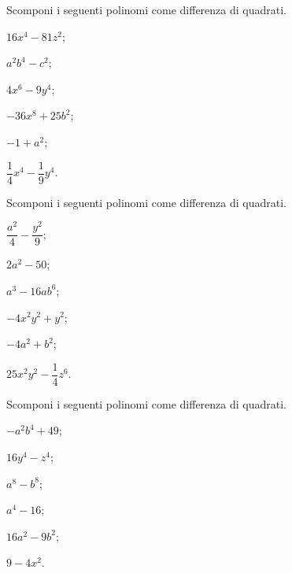 \begin{esercizio}
\label{ese:13.61}
Scomponi i seguenti polinomi come differenza di quadrati.
\begin{multicols}{3}
\begin{enumeratea}
 \item $16x^{4}-81z^{2}$;
 \item $a^{2}b^{4}-c^{2}$;
 \item $4x^{6}-9y^{4}$;
 \item $-36x^{8}+25b^{2}$;
 \item $-1+a^{2}$;
 \item $\dfrac{1}{4}x^{4}-\dfrac{1}{9}y^{4}$.
\end{enumeratea}
\end{multicols}
\end{esercizio}

\begin{esercizio}
\label{ese:13.62}
Scomponi i seguenti polinomi come differenza di quadrati.
\begin{multicols}{3}
\begin{enumeratea}
 \item $\dfrac{a^{2}}{4}-\dfrac{y^{2}}{9}$;
 \item $2a^{2}-50$;
 \item $a^{3}-16{ab}^{6}$;
 \item $-4x^{2}y^{2}+y^{2}$;
 \item $-4a^{2}+b^{2}$;
 \item $25x^{2}y^{2}-\dfrac{1}{4}z^{6}$.
\end{enumeratea}
\end{multicols}
\end{esercizio}

\begin{esercizio}
\label{ese:13.63}
Scomponi i seguenti polinomi come differenza di quadrati.
\begin{multicols}{3}
\begin{enumeratea}
 \item $-a^{2}b^{4}+49$;
 \item $16y^{4}-z^{4}$;
 \item $a^{8}-b^{8}$;
 \item $a^{4}-16$;
 \item $16a^{2}-9b^{2}$;
 \item $9-4x^{2}$.
\end{enumeratea}
\end{multicols}
\end{esercizio}


